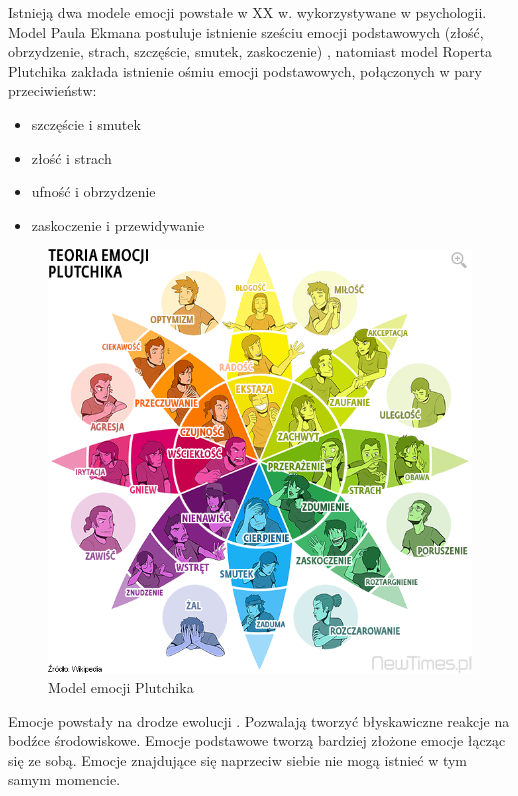 \documentclass[a4paper,12pt,twoside,openany]{report}
\begin{document}
Istnieją dwa modele emocji powstałe w XX w. wykorzystywane w psychologii.
Model Paula Ekmana postuluje istnienie sześciu emocji podstawowych (złość, obrzydzenie, strach, szczęście, smutek, zaskoczenie) \cite{Eisner2015},
natomiast model Roperta Plutchika zakłada istnienie ośmiu emocji podstawowych, połączonych w pary przeciwieństw:
\begin{itemize}
	\item szczęście i smutek
	\item złość i strach
	\item ufność i obrzydzenie
	\item zaskoczenie i przewidywanie
\end{itemize}
\begin{figure}[h]
	\centering
	\includegraphics[width=\textwidth]{Plutchik-Emotions-Wheel}
	\caption{Model emocji Plutchika}
	\label{rys:intro:plutnik}
\end{figure}
Emocje powstały na drodze ewolucji \cite{Plutchik2001}.
Pozwalają tworzyć błyskawiczne reakcje na bodźce środowiskowe.
Emocje podstawowe tworzą bardziej złożone emocje łącząc się ze sobą.
Emocje znajdujące się naprzeciw siebie nie mogą istnieć w tym samym momencie. 
\end{document}
